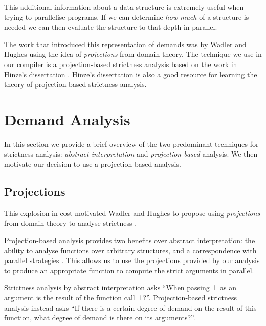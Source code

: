 This additional information about a data-structure is extremely useful when
trying to parallelise programs. If we can determine \emph{how much} of a
structure is needed we can then evaluate the structure to that depth in
parallel.


The work that introduced this representation of demands was by Wadler and
Hughes \citep{wadler1987projections} using the idea of \emph{projections} from
domain theory.  The technique we use in our compiler is a projection-based
strictness analysis based on the work in Hinze's dissertation
\citep{hinze1995projection}.  Hinze's dissertation is also a good resource for
learning the theory of projection-based strictness analysis.

\section{Demand Analysis}
\label{sec:strictness}
%

In this section we provide a brief overview of the two
predominant techniques for strictness analysis: \emph{abstract interpretation}
and \emph{projection-based} analysis.  We then motivate our decision to use a
projection-based analysis.

\subsection{Projections}

This explosion in cost motivated Wadler and Hughes to propose using
\emph{projections} from domain theory to analyse strictness
\citep{wadler1987projections}.


Projection-based analysis provides two benefits over abstract interpretation:
the ability to analyse functions over arbitrary structures, and a
correspondence with parallel strategies \citep{marlow2010seq, strategies}. This
allows us to use the projections provided by our analysis to produce an
appropriate function to compute the strict arguments in parallel.

Strictness analysis by abstract interpretation asks ``When passing $\bot$ as an
argument is the result of the function call $\bot$?''. Projection-based
strictness analysis instead asks ``If there is a certain degree of demand on
the result of this function, what degree of demand is there on its
arguments?''.

